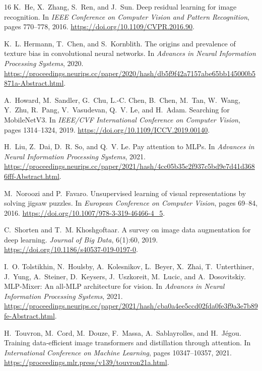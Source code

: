 \documentclass[12pt]{article}
\begin{document}
\begin{thebibliography}{16}
K.~He, X.~Zhang, S.~Ren, and J.~Sun.
\newblock Deep residual learning for image recognition.
\newblock In \emph{IEEE Conference on Computer Vision and Pattern Recognition}, pages 770--778, 2016.
\newblock \url{https://doi.org/10.1109/CVPR.2016.90}.

K.~L. Hermann, T.~Chen, and S.~Kornblith.
\newblock The origins and prevalence of texture bias in convolutional neural networks.
\newblock In \emph{Advances in Neural Information Processing Systems}, 2020.
\newblock \url{https://proceedings.neurips.cc/paper/2020/hash/db5f9f42a7157abe65bb145000b5871a-Abstract.html}.

A.~Howard, M.~Sandler, G.~Chu, L.-C. Chen, B.~Chen, M.~Tan, W.~Wang, Y.~Zhu, R.~Pang, V.~Vasudevan, Q.~V. Le, and H.~Adam.
\newblock Searching for MobileNetV3.
\newblock In \emph{IEEE/CVF International Conference on Computer Vision}, pages 1314--1324, 2019.
\newblock \url{https://doi.org/10.1109/ICCV.2019.00140}.

H.~Liu, Z.~Dai, D.~R. So, and Q.~V. Le.
\newblock Pay attention to MLPs.
\newblock In \emph{Advances in Neural Information Processing Systems}, 2021.
\newblock \url{https://proceedings.neurips.cc/paper/2021/hash/4cc05b35c2f937c5bd9e7d41d3686fff-Abstract.html}.

M.~Noroozi and P.~Favaro.
\newblock Unsupervised learning of visual representations by solving jigsaw puzzles.
\newblock In \emph{European Conference on Computer Vision}, pages 69--84, 2016.
\newblock \url{https://doi.org/10.1007/978-3-319-46466-4_5}.

C.~Shorten and T.~M. Khoshgoftaar.
\newblock A survey on image data augmentation for deep learning.
\newblock \emph{Journal of Big Data}, 6(1):60, 2019.
\newblock \url{https://doi.org/10.1186/s40537-019-0197-0}.

I.~O. Tolstikhin, N.~Houlsby, A.~Kolesnikov, L.~Beyer, X.~Zhai, T.~Unterthiner, J.~Yung, A.~Steiner, D.~Keysers, J.~Uszkoreit, M.~Lucic, and A.~Dosovitskiy.
\newblock MLP-Mixer: An all-MLP architecture for vision.
\newblock In \emph{Advances in Neural Information Processing Systems}, 2021.
\newblock \url{https://proceedings.neurips.cc/paper/2021/hash/cba0a4ee5ccd02fda0fe3f9a3e7b89fe-Abstract.html}.

H.~Touvron, M.~Cord, M.~Douze, F.~Massa, A.~Sablayrolles, and H.~Jégou.
\newblock Training data-efficient image transformers and distillation through attention.
\newblock In \emph{International Conference on Machine Learning}, pages 10347--10357, 2021.
\newblock \url{https://proceedings.mlr.press/v139/touvron21a.html}.

\end{thebibliography}
\end{document}
